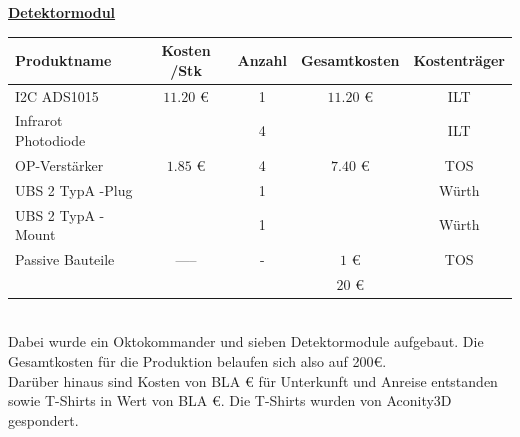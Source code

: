\large{\underline{\textbf{Detektormodul}}} \\ 

\normalsize
\begin{tabularx}{\textwidth}{p{4.5cm} | c c c c}

Produktname 			& Kosten /Stk 		& Anzahl & Gesamtkosten    & Kostenträger \\ \hline
I2C ADS1015				& $11.20$ \euro{}   &   1    & $11.20$ \euro{} & ILT    \\ [2mm]
Infrarot Photodiode 	&					&   4    &                 & ILT	\\ [8mm]
OP-Verstärker    		& $1.85$ \euro{}    &	4    & $7.40$ \euro{}  & TOS    \\ [2mm]
UBS 2 TypA -Plug		&                   &   1    &                 & Würth  \\ [2mm]
UBS 2 TypA -Mount		&                   &   1    &                 & Würth  \\ [2mm]
Passive Bauteile    	&	-----  	        &	-	 &	$1$ \euro{}	   & TOS    \\ [2mm]\hline
						&					&		 & $  20  $	\euro{}&
					
\end{tabularx} \\

Dabei wurde ein Oktokommander und sieben Detektormodule aufgebaut. Die Gesamtkosten für die Produktion belaufen sich also auf 200€.\\

Darüber hinaus sind Kosten von BLA \euro{} für Unterkunft und Anreise entstanden sowie T-Shirts in Wert von BLA \euro{}. Die T-Shirts wurden von Aconity3D gespondert.